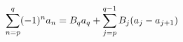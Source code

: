 \documentclass[preview]{standalone}
\begin{document}
\begin{align*}
\special{dvisvgm:raw <g id='unique000'>}\sum_{n=p}^q(-1)^na_n=B_qa_q+\sum_{j=p}^{q-1}B_j(a_j-a_{j+1})\special{dvisvgm:raw </g>}
\end{align*}
\end{document}
